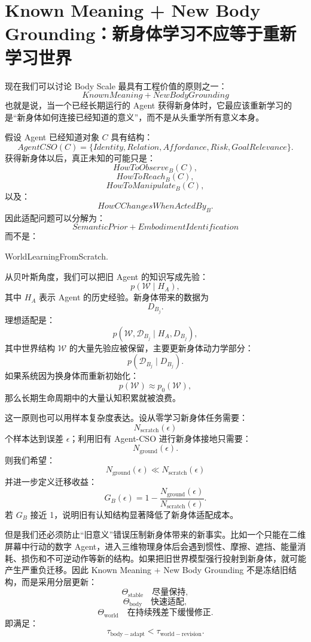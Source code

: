 \section{Known Meaning + New Body Grounding：新身体学习不应等于重新学习世界}

现在我们可以讨论 Body Scale 最具有工程价值的原则之一：
\[
\boxed{
KnownMeaning+NewBodyGrounding
}
\]
也就是说，当一个已经长期运行的 Agent 获得新身体时，它最应该重新学习的是“新身体如何连接已经知道的意义”，而不是从头重学所有意义本身。

假设 Agent 已经知道对象 $C$ 具有结构：
\[
AgentCSO(C)
=
\{
Identity,
Relation,
Affordance,
Risk,
GoalRelevance
\}.
\]
获得新身体以后，真正未知的可能只是：
\[
HowToObserve_B(C),
\]
\[
HowToReach_B(C),
\]
\[
HowToManipulate_B(C),
\]
以及：
\[
HowCChangesWhenActedBy_B.
\]
因此适配问题可以分解为：
\[
\boxed{
SemanticPrior
+
EmbodimentIdentification
}
\]
而不是：
\begin{statementbox}
WorldLearningFromScratch.
\end{statementbox}

从贝叶斯角度，我们可以把旧 Agent 的知识写成先验：
\[
p(\mathcal W\mid H_A),
\]
其中 $H_A$ 表示 Agent 的历史经验。新身体带来的数据为
\[
D_{B_j}.
\]
理想适配是：
\[
p(\mathcal W,\mathcal D_{B_j}
\mid
H_A,D_{B_j}),
\]
其中世界结构 $\mathcal W$ 的大量先验应被保留，主要更新身体动力学部分：
\[
p(\mathcal D_{B_j}\mid D_{B_j}).
\]
如果系统因为换身体而重新初始化：
\[
p(\mathcal W)\approx p_0(\mathcal W),
\]
那么长期生命周期中的大量认知积累就被浪费。

这一原则也可以用样本复杂度表达。设从零学习新身体任务需要：
\[
N_{\mathrm{scratch}}(\epsilon)
\]
个样本达到误差 $\epsilon$；利用旧有 Agent-CSO 进行新身体接地只需要：
\[
N_{\mathrm{ground}}(\epsilon).
\]
则我们希望：
\[
\boxed{
N_{\mathrm{ground}}(\epsilon)
\ll
N_{\mathrm{scratch}}(\epsilon)
}
\]
并进一步定义迁移收益：
\[
G_B(\epsilon)
=
1-
\frac{
N_{\mathrm{ground}}(\epsilon)
}{
N_{\mathrm{scratch}}(\epsilon)
}.
\]
若 $G_B$ 接近 1，说明旧有认知结构显著降低了新身体适配成本。

但是我们还必须防止“旧意义”错误压制新身体带来的新事实。比如一个只能在二维屏幕中行动的数字 Agent，进入三维物理身体后会遇到惯性、摩擦、遮挡、能量消耗、损伤和不可逆动作等新的结构。如果把旧世界模型强行投射到新身体，就可能产生严重负迁移。因此 Known Meaning + New Body Grounding 不是冻结旧结构，而是采用分层更新：
\[
\Theta_{\mathrm{stable}}
\quad \text{尽量保持},
\]
\[
\Theta_{\mathrm{body}}
\quad \text{快速适配},
\]
\[
\Theta_{\mathrm{world}}
\quad \text{在持续残差下缓慢修正}.
\]
即满足：
\[
\tau_{\mathrm{body-adapt}}
<
\tau_{\mathrm{world-revision}}.
\]

